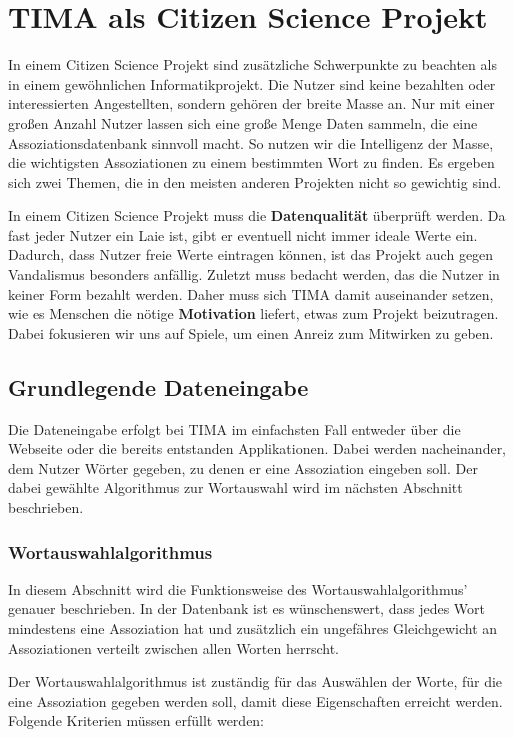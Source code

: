 \chapter{TIMA als Citizen Science Projekt}

In einem Citizen Science Projekt sind zusätzliche Schwerpunkte zu beachten als in einem gewöhnlichen Informatikprojekt. Die Nutzer sind keine bezahlten oder interessierten Angestellten, sondern gehören der breite Masse an. Nur mit einer großen Anzahl Nutzer lassen sich eine große Menge Daten sammeln, die eine Assoziationsdatenbank sinnvoll macht. So nutzen wir die Intelligenz der Masse, die wichtigsten Assoziationen zu einem bestimmten Wort zu finden. Es ergeben sich zwei Themen, die in den meisten anderen Projekten nicht so gewichtig sind.

In einem Citizen Science Projekt muss die \textbf{Datenqualität} überprüft werden. Da fast jeder Nutzer ein Laie ist, gibt er eventuell nicht immer ideale Werte ein. Dadurch, dass Nutzer freie Werte eintragen können, ist das Projekt auch gegen Vandalismus besonders anfällig. Zuletzt muss bedacht werden, das die Nutzer in keiner Form bezahlt werden. Daher muss sich TIMA damit auseinander setzen, wie es Menschen die nötige \textbf{Motivation} liefert, etwas zum Projekt beizutragen. Dabei fokusieren wir uns auf Spiele, um einen Anreiz zum Mitwirken zu geben.

\section{Grundlegende Dateneingabe}
Die Dateneingabe erfolgt bei TIMA im einfachsten Fall entweder über die Webseite oder die bereits entstanden Applikationen. Dabei werden nacheinander, dem Nutzer Wörter gegeben, zu denen er eine Assoziation eingeben soll. Der dabei gewählte Algorithmus zur Wortauswahl wird im nächsten Abschnitt beschrieben.

\subsection{Wortauswahlalgorithmus}\label{subsec:Wortauswahlalgorithmus}
In diesem Abschnitt wird die Funktionsweise des Wortauswahlalgorithmus' genauer beschrieben. In der Datenbank ist es wünschenswert, dass jedes Wort mindestens eine Assoziation hat und zusätzlich ein ungefähres Gleichgewicht an Assoziationen verteilt zwischen allen Worten herrscht. 

\newpage
Der Wortauswahlalgorithmus ist zuständig für das Auswählen der Worte, für die eine Assoziation gegeben werden soll, damit diese Eigenschaften erreicht werden. Folgende Kriterien müssen erfüllt werden:

